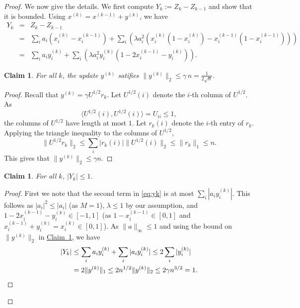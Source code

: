 \documentclass[11pt]{article}
\newcommand{\ip}[1]{\langle #1 \rangle}
\newtheorem{claim}[theorem]{Claim}
\theoremstyle{definition}
\newcommand{\expref}[2]{\texorpdfstring{\hyperref[#2]{#1~\ref{#2}}}{#1~\ref{#2}}}
\begin{document}
\begin{proof}
We now give the details.
We first compute $Y_k := Z_k - Z_{k-1} $ and show that it is bounded. Using
 $x^{(k)} = x^{(k-1)} + y^{(k)}$, we have
\begin{eqnarray}
Y_k & =&  Z_k - Z_{k-1} \nonumber \\
& = & \sum_i a_i (x_i^{(k)} - x_i^{(k-1)}) + \sum_i \left(\lambda a_i^2 ( x_i^{(k)}(1- x_i^{(k)}) - x_i^{(k-1)}(1- x_i^{(k-1)}))   \right) \nonumber \\
&= & \sum_i a_i y_i^{(k)} + \sum_i \left(\lambda a_i^2  y_i^{(k)} (1- 2 x_i^{(k-1)}  -  y_i^{(k)}) \right).
 \label{eq:yk}
\end{eqnarray}
%
\begin{claim}
\label{bound-y}
For all $k$, the update $y^{(k)}$ satifies $\|y^{(k)}\|_2 \leq \gamma\, n = \frac{1}{2\sqrt{n}}$.
\end{claim}
\begin{proof}
Recall that $y^{(k)} = \gamma U^{1/2} r_k$.  
Let $U^{1/2}(i)$ denote the $i$-th column of $U^{1/2}$. As
%
%
\[
\ip{U^{1/2}(i), U^{1/2}(i)} = U_{ii} \leq 1,     %
\]
the columns of $U^{1/2}$
have length at most $1$. 
Let $r_k(i)$ denote the $i$-th entry of $r_k$. Applying the triangle inequality to the columns of $U^{1/2}$,
\[ \|U^{1/2} r_k\|_2 \leq \sum_i |r_k(i) |\|U^{1/2}(i)\|_2  \leq \|r_k\|_1 \leq n.\]
This gives that $\|y^{(k)}\|_2 \leq \gamma n$.
\end{proof}
\begin{claim}
 For all $k$, $|Y_k| \leq 1$.
\end{claim}
\begin{proof}
First we note that the second term in \eqref{eq:yk} is at most $\sum_i |a_i y_i^{(k)}|$.
This follows as $|a_i|^2 \leq |a_i|$ (as $M=1$), $\lambda \leq 1$ by our assumption, and
$1-2x_i^{(k-1)} - y_i^{(k)} \in [-1,1]$ (as $1-x_i^{(k-1)} \in [0,1]$  and
$ x_i^{(k-1)} + y_i^{(k)} = x_i^{(k)} \in [0,1] $). As $\|a\|_\infty\leq 1$ and using the bound on $\|y^{(k)}\|_2$ in \expref{Claim}{bound-y}, we have 
%
%
\begin{align*}
  |Y_k| & \leq %
                 \sum_i a_i y_i^{(k)} +    \sum_i |a_i y_i^{(k)}|
\leq 2 \sum_i  |y_i^{(k)}| \\
        & = %
              2 \|y^{(k)}\|_1  \leq 2 n^{1/2}
\|y^{(k)}\|_2  \leq 2 \gamma n^{3/2} = 1. \qedhere
\end{align*}
%
\end{proof}


\end{proof}
\end{document}
